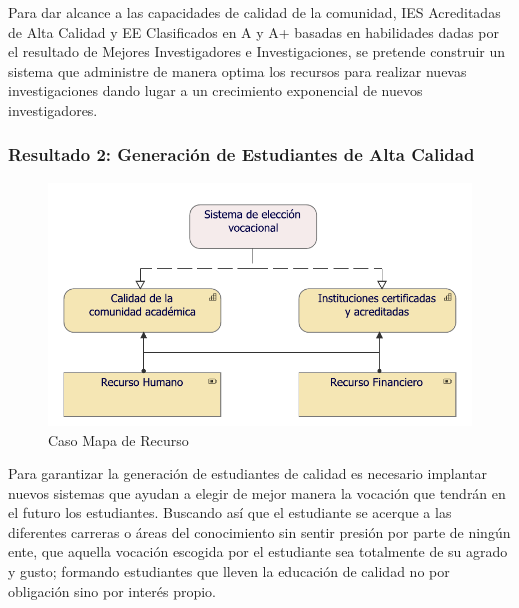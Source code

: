 Para dar alcance a las capacidades de calidad de la comunidad, IES Acreditadas de Alta Calidad y EE Clasificados en A y A+ basadas en habilidades dadas por el resultado de Mejores Investigadores e Investigaciones, se pretende construir un sistema que administre de manera optima los recursos para realizar nuevas investigaciones dando lugar a un crecimiento exponencial de nuevos investigadores.

\clearpage
\subsubsection{Resultado 2: Generación de Estudiantes de Alta Calidad}

\begin{figure}[h!]
	\centering
	\includegraphics[width=.8\linewidth]{imgs/modelo/estrategia/mapa/mapa_recurso_2.pdf}
	\caption{Caso Mapa de Recurso}
\end{figure}

Para garantizar la generación de estudiantes de calidad es necesario implantar nuevos sistemas que ayudan a elegir de mejor manera la vocación que tendrán en el futuro los estudiantes. Buscando así que el estudiante se acerque a las diferentes carreras o áreas del conocimiento sin sentir presión por parte de ningún ente, que aquella vocación escogida por el estudiante sea totalmente de su agrado y gusto; formando estudiantes que lleven la educación de calidad no por obligación sino por interés propio.